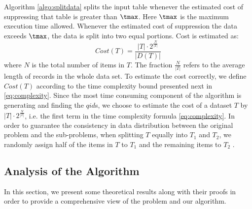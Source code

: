 Algorithm \ref{algo:splitdata}
splits the input table whenever the estimated cost of
suppressing that table is greater than $\tmax$.
Here $\tmax$ is the maximum execution time allowed.
Whenever the estimated cost of suppression the data exceeds
$\tmax$, the data is split into two equal portions.
Cost is estimated as:
\begin{equation}\label{eq:costfunc}
Cost(T)=\frac{|T|\cdot 2^{\frac{N}{|T|}}}{|D(T)|}
\end{equation}
where $N$ is the total number of items in $T$. The fraction $\frac{N}{|T|}$ refers to the average length of records in the whole data set.
To estimate the cost correctly, we define $Cost(T)$ according to
the time complexity bound presented next in \eqref{eq:complexity}.
Since the most time consuming component of the algorithm is generating and
finding the $qid$s, we choose to estimate the cost of a dataset $T$
by $|T|\cdot 2^{\frac{N}{|T|}}$, i.e. the first term in the time complexity
formula \eqref{eq:complexity}.
In order to guarantee the consistency in data distribution between the original problem and the sub-problems, when splitting $T$ equally into $T_1$ and $T_2$, we randomly assign half of the items in $T$ to $T_1$ and the remaining items to $T_2$ .

\subsection{Analysis of the Algorithm}
\label{sec:analysis}

%
In this section, we present some theoretical results along with their proofs
in order to provide a comprehensive view of the problem and our algorithm.

